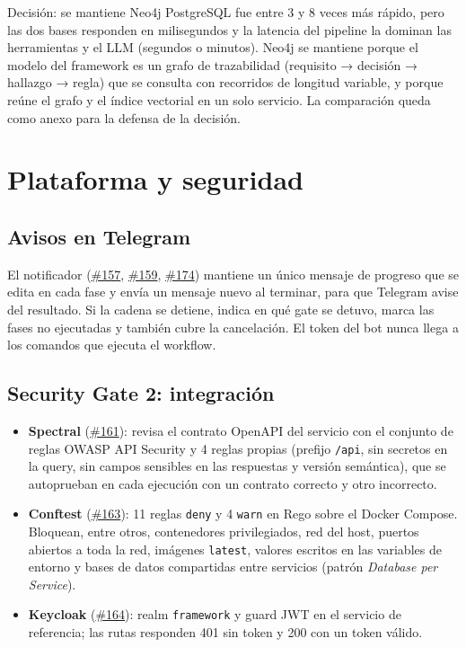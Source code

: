 \documentclass[11pt,a4paper]{report}
\newcommand{\pr}[1]{\href{https://github.com/PracticasESPE/Framework_Desarrollo_Seguro/pull/#1}{\##1}}
\begin{document}
\begin{cajaazul}{Decisión: se mantiene Neo4j}
PostgreSQL fue entre 3 y 8 veces más rápido, pero las dos bases responden en milisegundos y la
latencia del pipeline la dominan las herramientas y el LLM (segundos o minutos). Neo4j se mantiene
porque el modelo del framework es un grafo de trazabilidad (requisito → decisión → hallazgo →
regla) que se consulta con recorridos de longitud variable, y porque reúne el grafo y el índice
vectorial en un solo servicio. La comparación queda como anexo para la defensa de la decisión.
\end{cajaazul}

\section{Plataforma y seguridad}

\subsection{Avisos en Telegram}
El notificador (\pr{157}, \pr{159}, \pr{174}) mantiene un único mensaje de progreso que se edita
en cada fase y envía un mensaje nuevo al terminar, para que Telegram avise del resultado. Si la
cadena se detiene, indica en qué gate se detuvo, marca las fases no ejecutadas y también cubre la
cancelación. El token del bot nunca llega a los comandos que ejecuta el workflow.

\subsection{Security Gate 2: integración}
\begin{itemize}
\item \textbf{Spectral} (\pr{161}): revisa el contrato OpenAPI del servicio con el conjunto de
reglas OWASP API Security y 4 reglas propias (prefijo \texttt{/api}, sin secretos en la query, sin
campos sensibles en las respuestas y versión semántica), que se autoprueban en cada ejecución con
un contrato correcto y otro incorrecto.
\item \textbf{Conftest} (\pr{163}): 11 reglas \texttt{deny} y 4 \texttt{warn} en Rego sobre el
Docker Compose. Bloquean, entre otros, contenedores privilegiados, red del host, puertos abiertos
a toda la red, imágenes \texttt{latest}, valores escritos en las variables de entorno y bases de
datos compartidas entre servicios (patrón \emph{Database per Service}).
\item \textbf{Keycloak} (\pr{164}): realm \texttt{framework} y guard JWT en el servicio de
referencia; las rutas responden 401 sin token y 200 con un token válido.
\end{itemize}
\end{document}
